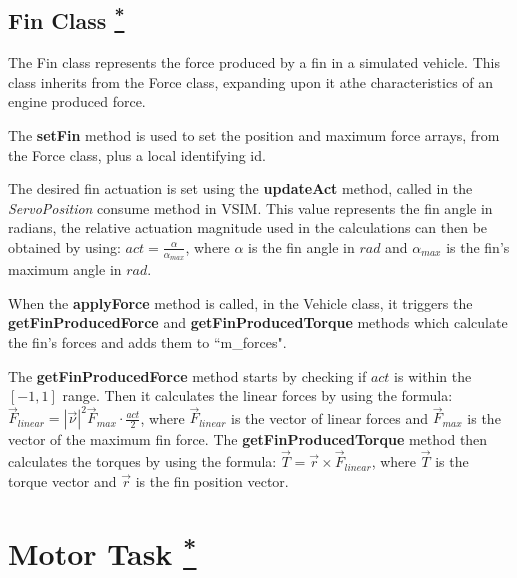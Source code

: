 \documentclass[10pt,a4paper]{article}
\begin{document}
\subsection{Fin Class \href{https://www.lsts.pt/docs/dune/dune-2017.01.0-dmsmw/d0/dfa/classSimulators_1_1VSIM_1_1Fin.html}{\textsuperscript{*}}}
\label{fin_class}

\par The Fin class represents the force produced by a fin in a simulated vehicle. This class inherits from the Force class, expanding upon it athe characteristics of an engine produced force. 

\par The \textbf{setFin} method is used to set the position and maximum force arrays, from the Force class, plus a local identifying id.

\par The desired fin actuation is set using the \textbf{updateAct} method, called in the \textit{ServoPosition} consume method in VSIM. This value represents the fin angle in radians, the relative actuation magnitude used in the calculations can then be obtained by using: $act = \frac{\alpha}{\alpha_{max}}$, where $\alpha$ is the fin angle in $rad$ and $\alpha_{max}$ is the fin's maximum angle in $rad$.

\par When the \textbf{applyForce} method is called, in the Vehicle class, it triggers the \textbf{getFinProducedForce} and \textbf{getFinProducedTorque} methods which calculate the fin's forces and adds them to ``m\_forces".

\par The \textbf{getFinProducedForce} method starts by checking if $act$ is within the $\left[-1,1\right]$ range. Then it calculates the linear forces by using the formula: $\vec{F}_{linear} = \left|\vec{\nu}\right|^2 \vec{F}_{max}\cdot\frac{act}{2}$, where $\vec{F}_{linear}$ is the vector of linear forces and $\vec{F}_{max}$ is the vector of the maximum fin force. The \textbf{getFinProducedTorque} method then calculates the torques by using the formula: $\vec{T} = \vec{r} \times \vec{F}_{linear}$, where $\vec{T}$ is the torque vector and $\vec{r}$ is the fin position vector.

\section{Motor Task \href{https://www.lsts.pt/docs/dune/dune-2017.01.0-dmsmw/d1/d8f/structSimulators_1_1Motor_1_1Task.html}{\textsuperscript{*}}}
\label{motor_task}
\end{document}
